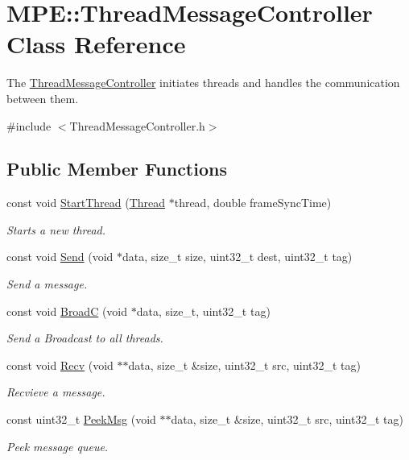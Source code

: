 \hypertarget{class_m_p_e_1_1_thread_message_controller}{}\section{M\+PE\+:\+:Thread\+Message\+Controller Class Reference}
\label{class_m_p_e_1_1_thread_message_controller}


The \hyperlink{class_m_p_e_1_1_thread_message_controller}{Thread\+Message\+Controller} initiates threads and handles the communication between them.  




{\ttfamily \#include $<$Thread\+Message\+Controller.\+h$>$}

\subsection*{Public Member Functions}
\begin{DoxyCompactItemize}
\item 
const void \hyperlink{class_m_p_e_1_1_thread_message_controller_a08663e963b8ac560e0678527a6f0cd86}{Start\+Thread} (\hyperlink{class_m_p_e_1_1_thread}{Thread} $\ast$thread, double frame\+Sync\+Time)
\begin{DoxyCompactList}\small\item\em Starts a new thread. \end{DoxyCompactList}\item 
const void \hyperlink{class_m_p_e_1_1_thread_message_controller_ad4fdb8a09a50306d1002fd3fb5bae5e3}{Send} (void $\ast$data, size\+\_\+t size, uint32\+\_\+t dest, uint32\+\_\+t tag)
\begin{DoxyCompactList}\small\item\em Send a message. \end{DoxyCompactList}\item 
const void \hyperlink{class_m_p_e_1_1_thread_message_controller_a76ce2d05dfedd82e6d522151d42880f6}{BroadC} (void $\ast$data, size\+\_\+t, uint32\+\_\+t tag)
\begin{DoxyCompactList}\small\item\em Send a Broadcast to all threads. \end{DoxyCompactList}\item 
const void \hyperlink{class_m_p_e_1_1_thread_message_controller_ab55fff1fb40f1456efb7e029fa1ddb89}{Recv} (void $\ast$$\ast$data, size\+\_\+t \&size, uint32\+\_\+t src, uint32\+\_\+t tag)
\begin{DoxyCompactList}\small\item\em Recvieve a message. \end{DoxyCompactList}\item 
const uint32\+\_\+t \hyperlink{class_m_p_e_1_1_thread_message_controller_abfa4aaad59117d2b4f83cf7504d55cb7}{Peek\+Msg} (void $\ast$$\ast$data, size\+\_\+t \&size, uint32\+\_\+t src, uint32\+\_\+t tag)
\begin{DoxyCompactList}\small\item\em Peek message queue. \end{DoxyCompactList}\end{DoxyCompactItemize}


